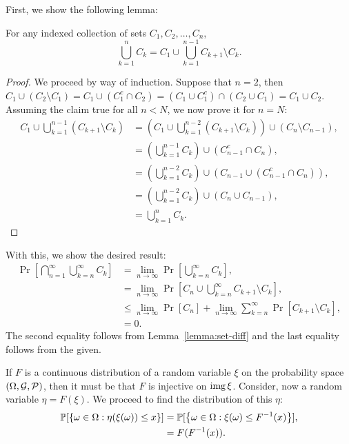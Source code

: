 \begin{solution}
    First, we show the following lemma:
    \begin{lemma}\label{lemma:set-diff}
        For any indexed collection of sets $C_1,C_2,\ldots,C_n$, \[
            \bigcup_{k=1}^n C_k = C_1 \cup \bigcup_{k=1}^{n-1} C_{k+1} \setminus C_k.  
        \]
    \end{lemma}
    \begin{proof}
        We proceed by way of induction. Suppose that $n=2$, then $C_1 \cup (C_2 \setminus C_1) = C_1 \cup (C_1^c \cap C_2) = (C_1 \cup C_1^c) \cap (C_2 \cup C_1) = C_1 \cup C_2$. Assuming the claim true for all $n < N$, we now prove it for $n=N$:
        \begin{align*}
            C_1 \cup \bigcup_{k=1}^{n-1} (C_{k+1} \setminus C_k) &= \left(C_1 \cup \bigcup_{k=1}^{n-2} (C_{k+1} \setminus C_k)\right)\cup (C_n\setminus C_{n-1}), \\
            &= \left(\bigcup_{k=1}^{n-1} C_k \right) \cup (C_{n-1}^c \cap C_n), \tag{by ind. hyp.}\\
            &= \left(\bigcup_{k=1}^{n-2} C_k\right) \cup \left(C_{n-1} \cup (C_{n-1}^c \cap C_n)\right), \\
            &= \left(\bigcup_{k=1}^{n-2} C_k\right) \cup (C_n \cup C_{n-1}), \\
            &= \bigcup_{k=1}^n C_k.
        \end{align*}
    \end{proof}
    With this, we show the desired result:
    \begin{align*}
        \Pr\left[\bigcap_{n=1}^\infty \bigcup_{k=n}^\infty C_k\right] &= \lim_{n\to\infty} \Pr\left[\bigcup_{k=n}^\infty C_k\right], \\
        &= \lim_{n\to\infty} \Pr\left[C_n \cup \bigcup_{k=n}^\infty C_{k+1} \setminus C_k\right], \\
        &\leq \lim_{n\to\infty} \Pr[C_n] + \lim_{n\to\infty} \sum_{k=n}^\infty \Pr[C_{k+1} \setminus C_k], \\
        &= 0.
    \end{align*}
    The second equality follows from Lemma~\ref{lemma:set-diff} and the last equality follows from the given.
\end{solution}
\begin{problem}{15}
\end{problem}
\begin{solution}
    If $F$ is a continuous distribution of a random variable $\xi$ on the probability space $(\Omega, \mathcal{G}, \mathcal{P})$, then it must be that $F$ is injective on $\operatorname{img} \xi$. Consider, now a random variable $\eta = F(\xi)$. We proceed to find the distribution of this $\eta$:
    \begin{align*}
        \mathbb{P}[\left\{ \omega \in \Omega: \eta(\xi(\omega)) \leq x \right\}] &= \mathbb{P}[\left\{ \omega \in \Omega: \xi(\omega) \leq F^{-1}(x) \right\}], \\
        &= F(F^{-1}(x)).
    \end{align*}
\end{solution}